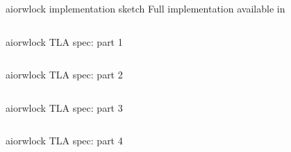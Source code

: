 \documentclass[12pt]{beamer}
\begin{document}
  \begin{frame}{aiorwlock implementation sketch}
      Full implementation available in~\cite{jettify2016}
      \begin{center}
          \inputminted[linenos,fontsize=\scriptsize]{python}{figures/read.py}
      \end{center}
  \end{frame}
  \begin{frame}{aiorwlock TLA spec: part 1}
      \begin{center}
          \inputminted[firstline=1,lastline=19,linenos,fontsize=\scriptsize]{tla}{figures/aiorwlock.tla}
      \end{center}
  \end{frame}
  \begin{frame}{aiorwlock TLA spec: part 2}
      \begin{center}
          \inputminted[firstline=20,lastline=31,linenos,fontsize=\scriptsize]{tla}{figures/aiorwlock.tla}
      \end{center}
  \end{frame}
  \begin{frame}{aiorwlock TLA spec: part 3}
      \begin{center}
          \inputminted[firstline=34,lastline=47,linenos,fontsize=\scriptsize]{tla}{figures/aiorwlock.tla}
      \end{center}
  \end{frame}
  \begin{frame}{aiorwlock TLA spec: part 4}
      \begin{center}
          \inputminted[firstline=47,lastline=58,linenos,fontsize=\scriptsize]{tla}{figures/aiorwlock.tla}
      \end{center}
  \end{frame}
\end{document}
